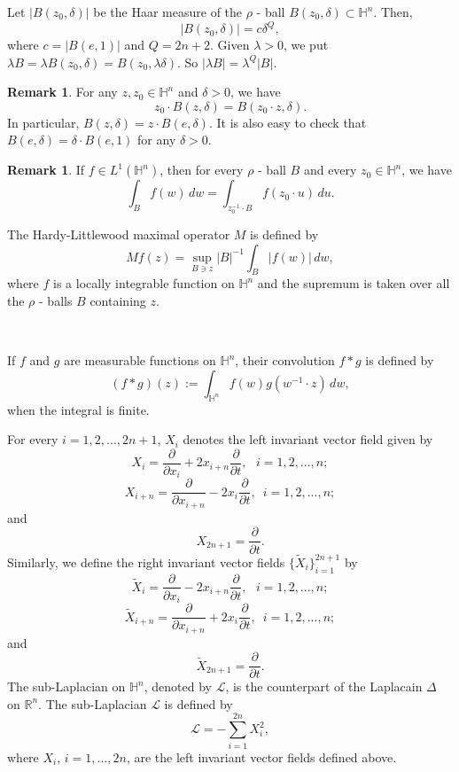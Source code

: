 \documentclass[reqno,10pt]{article}
\theoremstyle{definition}
\newtheorem{remark}[theorem]{Remark}
\numberwithin{equation}{section}
\numberwithin{theorem}{section}
\begin{document}
Let $|B(z_0, \delta)|$ be the Haar measure of the $\rho$ - ball $B(z_0, \delta) \subset \mathbb{H}^{n}$. Then, 
\[
|B(z_0, \delta)| = c \delta^{Q},
\]
where $c = |B(e,1)|$ and  $Q = 2n+2$. Given $\lambda > 0$, we put $\lambda B = \lambda B(z_0, \delta) = 
B(z_0, \lambda \delta)$. So $|\lambda B| = \lambda^{Q}	|B|$.

\begin{remark}
For any $z, z_0 \in \mathbb{H}^{n}$ and $\delta >0$, we have
\[
z_0 \cdot B(z, \delta) = B(z_0 \cdot z, \delta).
\]
In particular, $B(z, \delta) = z \cdot B(e, \delta)$. It is also easy to check that $B(e, \delta) = \delta \cdot B(e,1)$ for any $\delta > 0$.
\end{remark}
\begin{remark} \label{cambio de centro}
If $f \in L^{1}(\mathbb{H}^{n})$, then for every $\rho$ - ball $B$ and every $z_0 \in \mathbb{H}^{n}$, we have
\[
\int_{B} f(w) \, dw = \int_{z_{0}^{-1} \cdot B} f(z_0 \cdot u) \, du.
\]
\end{remark}

The Hardy-Littlewood maximal operator $M$ is defined by
\[
Mf(z) = \sup_{B \ni z} |B|^{-1}\int_{B} |f(w)| \, dw,
\]
where $f$ is a locally integrable function on $\mathbb{H}^{n}$ and the supremum is taken over all the $\rho$ - balls $B$ containing $z$.

\

If $f$ and $g$ are measurable functions on $\mathbb{H}^{n}$, their convolution $f * g$ is defined by
\[
(f * g)(z) := \int_{\mathbb{H}^{n}} f(w) g(w^{-1} \cdot z) \, dw,
\]
when the integral is finite.

For every $i = 1,2, ..., 2n+1$, $X_i$ denotes the left invariant vector field given by
\[
X_i = \frac{\partial}{\partial x_i} + 2 x_{i+n} \frac{\partial}{\partial t}, \,\,\,\, i=1, 2, ..., n;
\]
\[
X_{i+n} = \frac{\partial}{\partial x_{i+n}} - 2 x_{i} \frac{\partial}{\partial t}, \,\,\, i=1, 2, ..., n;
\]
and
\[
X_{2n+1} = \frac{\partial}{\partial t}.
\]
Similarly, we define the right invariant vector fields $\{ \widetilde{X}_i \}_{i=1}^{2n+1}$ by
\[
\widetilde{X}_i = \frac{\partial}{\partial x_i} - 2 x_{i+n} \frac{\partial}{\partial t}, \,\,\,\, i=1, 2, ..., n;
\]
\[
\widetilde{X}_{i+n} = \frac{\partial}{\partial x_{i+n}} + 2 x_{i} \frac{\partial}{\partial t}, \,\,\, i=1, 2, ..., n;
\]
and
\[
\widetilde{X}_{2n+1} = \frac{\partial}{\partial t}.
\]
The sub-Laplacian on $\mathbb{H}^n$, denoted by $\mathcal{L}$, is the counterpart of the Laplacain $\Delta$ on $\mathbb{R}^n$. The 
sub-Laplacian $\mathcal{L}$ is defined by
\[
\mathcal{L} =- \sum_{i=1}^{2n} X_i^2,
\]
where $X_i$, $i= 1, ..., 2n$, are the left invariant vector fields defined above.
\end{document}
